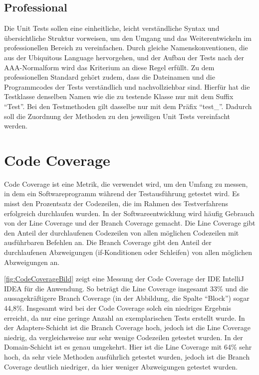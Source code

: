 \subsection{Professional}

Die Unit Tests sollen eine einheitliche, leicht verständliche Syntax und übersichtliche Struktur vorweisen, um den Umgang und das Weiterentwickeln im professionellen Bereich zu vereinfachen. Durch gleiche Namenskonventionen, die aus der Ubiquitous Language hervorgehen, und der Aufbau der Tests nach der AAA-Normalform wird das Kriterium an diese Regel erfüllt. Zu dem professionellen Standard gehört zudem, dass die Dateinamen und die Programmcodes der Tests verständlich und nachvollziehbar sind. Hierfür hat die Testklasse denselben Namen wie die zu testende Klasse nur mit dem Suffix \enquote{Test}. Bei den Testmethoden gilt dasselbe nur mit dem Präfix \enquote{test\_}. Dadurch soll die Zuordnung der Methoden zu den jeweiligen Unit Tests vereinfacht werden. 


\section{Code Coverage}
\label{CodeCoverage}

Code Coverage ist eine Metrik, die verwendet wird, um den Umfang zu messen, in dem ein Softwareprogramm während der Testausführung getestet wird. Es misst den Prozentsatz der Codezeilen, die im Rahmen des Testverfahrens erfolgreich durchlaufen wurden.
In der Softwareentwicklung wird häufig Gebrauch von der Line Coverage und der Branch Coverage gemacht. Die Line Coverage gibt den Anteil der durchlaufenen Codezeilen von allen möglichen Codezeilen mit ausführbaren Befehlen an. Die Branch Coverage gibt den Anteil der durchlaufenen Abzweigungen (if-Konditionen oder Schleifen) von allen möglichen Abzweigungen an.

\autoref{fig:CodeCoverageBild} zeigt eine Messung der Code Coverage der IDE IntelliJ IDEA für die Anwendung. So beträgt die Line Coverage insgesamt 33\% und die aussagekräftigere Branch Coverage (in der Abbildung, die Spalte \enquote{Block}) sogar 44,8\%. Insgesamt wird bei der Code Coverage solch ein niedriges Ergebnis erreicht, da nur eine geringe Anzahl an exemplarischen Tests erstellt wurde. 
In der Adapters-Schicht ist die Branch Coverage hoch, jedoch ist die Line Coverage niedrig, da vergleichsweise nur sehr wenige Codezeilen getestet wurden. In der Domain-Schicht ist es genau umgekehrt. Hier ist die Line Coverage mit 64\% sehr hoch, da sehr viele Methoden ausführlich getestet wurden, jedoch ist die Branch Coverage deutlich niedriger, da hier weniger Abzweigungen getestet wurden. 

